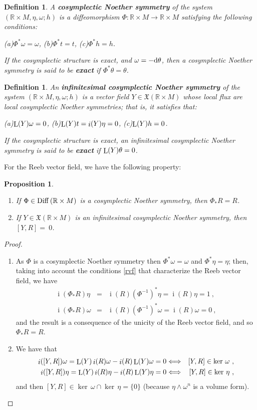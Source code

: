 \documentclass[12pt]{report}
\newtheorem{prop}[teor]{Proposition}
\newtheorem{definition}[teor]{Definition}
\def\beann{\begin{eqnarray*}}
\def\eeann{\end{eqnarray*}}
\def\ben{\begin{enumerate}}
\def\een{\end{enumerate}}
\def\qed{\ifvmode\removelastskip\fi
{\unskip\nobreak\hfil\penalty50\hbox{}\nobreak\hfil
\hbox{\vrule height1.2ex width1.2ex}\parfillskip=0pt
\finalhyphendemerits=0 \par\smallskip}}
\def\vf{\mathfrak X}
\def\d{{\rm d}}
\def\Real{\mathbb{R}}
\def\Lie{\mathop{\rm L}\nolimits}
\def\inn{\mathop{i}\nolimits}
\begin{document}
\begin{definition}
\label{ksns}
 A \textbf{cosymplectic Noether symmetry} of the system $(\Real\times M,\eta,\omega;h)$ is a diffeomorphism
$\Phi\colon \Real\times M\to \Real\times M$
satisfying the following conditions:

(a)\quad $\Phi^*\omega=\omega$, \quad
(b)\quad $\Phi^*t=t$, \quad
(c)\quad $\Phi^*h=h$.

If the cosymplectic structure is exact, and $\omega=-\d\theta$,
then a cosymplectic Noether symmetry
is said to be \textbf{exact} if $\Phi^*\theta=\theta$.
\end{definition}

\begin{definition}
\label{cosymsym}
An \textbf{infinitesimal cosymplectic Noether symmetry}
of the system $(\Real\times M,\eta,\omega;h)$ is a vector field $Y\in\vf( \Real\times M)$ whose local flux are local cosymplectic Noether symmetries;
that is, it satisfies that:

(a)\quad $\Lie(Y)\omega=0$, \quad
(b)\quad $\Lie(Y)t=\inn(Y)\eta=0$, \quad
(c)\quad $\Lie(Y)h=0$.

If the cosymplectic structure is exact,
an infinitesimal cosymplectic Noether symmetry
is said to be \textbf{exact} if $\Lie(Y)\theta=0$.
\end{definition}

For the Reeb vector field, we have the following property:

\begin{prop}
\label{lematec}
\ben
\item
If $\Phi\in{\rm Diff}\, (\Real\times M)$ is a cosymplectic Noether symmetry, then $\Phi_*R=R$.
\item
If $Y\in\vf(\Real\times M)$
is an infinitesimal cosymplectic Noether symmetry,
then $[Y,R]=~0$.
\een
\end{prop}
\begin{proof}
\ben
\item
As $\Phi$ is a  cosymplectic Noether symmetry then
$\Phi^*\omega=\omega$ and $\Phi^*\eta=\eta$; then,
taking into account the conditions \eqref{rvf} that characterize the Reeb vector field, we have
\beann
\inn(\Phi_*R)\eta&=&\inn(R)(\Phi^{-1})^*\eta=\inn(R)\eta=1 \ , \\
\inn(\Phi_*R)\omega&=&\inn(R)(\Phi^{-1})^*\omega=\inn(R)\omega=0 \ ,
\eeann
and the result is a consequence of the unicity of the Reeb vector field,
and so $\Phi_*R=R$.
\item
We have that
\beann
\inn([Y,R])\omega=
\Lie(Y)\inn(R)\omega-\inn(R)\Lie(Y)\omega=0 & \Longleftrightarrow &
[Y,R]\in\ker\,\omega\ ,
\\
\inn([Y,R])\eta =
\Lie(Y)\inn(R)\eta-\inn(R)\Lie(Y)\eta=0
& \Longleftrightarrow & [Y,R]\in\ker\,\eta\ , \eeann 
and then
$[Y,R]\in\ker\,\omega\cap\ker\,\eta=\{ 0\}$ (because $\eta\wedge\omega^n$ is a volume form).
\een
\qed\end{proof}
\end{document}
